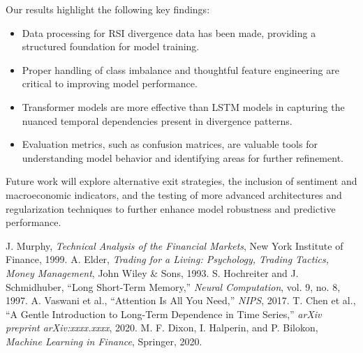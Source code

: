 \documentclass[letterpaper, 10 pt, conference]{ieeeconf}  %
\begin{document}
Our results highlight the following key findings:
\begin{itemize}
    \item Data processing for RSI divergence data has been made, providing a structured foundation for model training.
    \item Proper handling of class imbalance and thoughtful feature engineering are critical to improving model performance.
    \item Transformer models are more effective than LSTM models in capturing the nuanced temporal dependencies present in divergence patterns.
    \item Evaluation metrics, such as confusion matrices, are valuable tools for understanding model behavior and identifying areas for further refinement.
\end{itemize}

Future work will explore alternative exit strategies, the inclusion of sentiment and macroeconomic indicators, and the testing of more advanced architectures and regularization techniques to further enhance model robustness and predictive performance.

\begin{thebibliography}{99}

 J. Murphy, \textit{Technical Analysis of the Financial Markets}, New York Institute of Finance, 1999.
 A. Elder, \textit{Trading for a Living: Psychology, Trading Tactics, Money Management}, John Wiley \& Sons, 1993.
 S. Hochreiter and J. Schmidhuber, ``Long Short-Term Memory,'' \textit{Neural Computation}, vol. 9, no. 8, 1997.
 A. Vaswani et al., ``Attention Is All You Need,'' \textit{NIPS}, 2017.
 T. Chen et al., ``A Gentle Introduction to Long-Term Dependence in Time Series,'' {\it arXiv preprint arXiv:xxxx.xxxx}, 2020.
 M. F. Dixon, I. Halperin, and P. Bilokon, {\it Machine Learning in Finance}, Springer, 2020.

\end{thebibliography}
\end{document}
